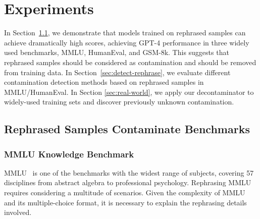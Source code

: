 

\section{Experiments}

In Section~\ref{sec:rephrase-exp}, we demonstrate that models trained on rephrased samples can achieve dramatically high scores, achieving GPT-4 performance in three widely used benchmarks, MMLU, HumanEval, and GSM-8k.
This suggests that rephrased samples should be considered as contamination and should be removed from training data.
In Section~\ref{sec:detect-rephrase}, we evaluate different contamination detection methods based on rephrased samples in MMLU/HumanEval.
In Section \ref{sec:real-world}, we apply our decontaminator to widely-used training sets and discover previously unknown contamination.

\subsection{Rephrased Samples Contaminate Benchmarks}
\label{sec:rephrase-exp}

\subsubsection{MMLU Knowledge Benchmark}
\label{sec:false_pos}
MMLU~\citep{hendrycks2020mmlu} is one of the benchmarks with the widest range of subjects, covering 57 disciplines from abstract algebra to professional psychology. Rephrasing MMLU requires considering a multitude of scenarios. Given the complexity of MMLU and its multiple-choice format, it is necessary to explain the rephrasing details involved.


